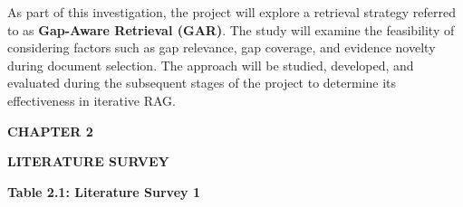 \documentclass[12pt,a4paper]{report}
\newcommand{\chaptertitle}[2]{
    \begin{center}
        {\fontsize{18}{21}\selectfont\bfseries CHAPTER #1\par}
        \vspace{0.10in}
        {\fontsize{18}{21}\selectfont\bfseries #2\par}
    \end{center}
    \vspace{0.12in}
}
\begin{document}
As part of this investigation, the project will explore a retrieval strategy referred to as \textbf{Gap-Aware Retrieval (GAR)}. The study will examine the feasibility of considering factors such as gap relevance, gap coverage, and evidence novelty during document selection. The approach will be studied, developed, and evaluated during the subsequent stages of the project to determine its effectiveness in iterative RAG.

\clearpage




\chaptertitle{2}{LITERATURE SURVEY}

\small


\begin{center}
\textbf{Table 2.1: Literature Survey 1}
\end{center}
\end{document}

